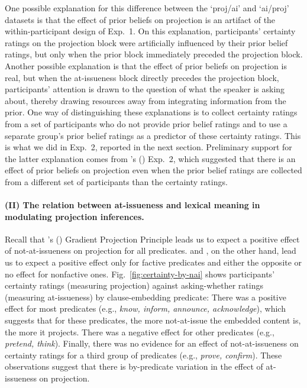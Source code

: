 \documentclass[11pt,fleqn]{article}
\newcommand{\6}{\mbox{$[\hspace*{-.6mm}[$}}
\newcommand{\9}{\mbox{$]\hspace*{-.6mm}]$}}
\newcommand{\citetpos}[1]{\citeauthor{#1}'s (\citeyear{#1})}
\begin{document}
One possible explanation for this difference between the `proj/ai' and `ai/proj' datasets is that the effect of prior beliefs on projection is an artifact of the within-participant design of Exp.~1. On this explanation, participants' certainty ratings on the projection block were artificially influenced by their prior belief ratings, but only when the prior block immediately preceded the projection block. Another possible explanation is that the effect of prior beliefs on projection is real, but when the at-issueness block directly precedes the projection block, participants' attention is drawn to the question of what the speaker is asking about, thereby drawing resources away from integrating information from the prior. One way of distinguishing these explanations is to collect certainty ratings from a set of participants who do not provide prior belief ratings and to use a separate group's prior belief ratings as a predictor of these certainty ratings. This is what we did in Exp.~2,  reported in the next section. Preliminary support for the latter explanation comes from \citetpos{degen-tonhauser-openmind} Exp.~2, which suggested that there is an effect of prior beliefs on projection even when the prior belief ratings are collected from a different set of participants than the certainty ratings.
                          
\paragraph{(II) The relation between at-issueness and lexical meaning in modulating projection inferences.} Recall that \citetpos{tbd-variability} Gradient Projection Principle leads us to expect a positive effect of not-at-issueness on projection for all predicates. \cite{djaerv-bacovcin-salt27,djaerv-bacovcin2020} and \cite{mahler-etal2020}, on the other hand, lead us to expect a positive effect only for factive predicates and either the opposite or no effect for nonfactive ones. Fig.~\ref{fig:certainty-by-nai} shows participants' certainty ratings (measuring projection) against asking-whether ratings (measuring at-issueness) by clause-embedding predicate: There was a positive effect for most predicates (e.g., {\em know, inform, announce, acknowledge}), which suggests that for these predicates, the more not-at-issue the embedded content is, the more it projects. There was a negative effect for other predicates (e.g., {\em pretend, think}). Finally, there was no evidence for an effect of not-at-issueness on certainty ratings for a third group of predicates (e.g., {\em prove, confirm}). These observations suggest that there is by-predicate variation in the effect of at-issueness on projection.
\end{document}
